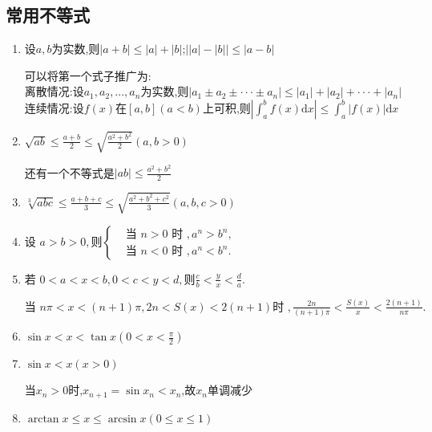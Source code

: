 \documentclass[12pt, a4paper, oneside, UTF8]{ctexbook}  %
\begin{document}
\begin{sloppypar}
    \subsection{常用不等式}
    \begin{enumerate}
        \item 设$a,b$为实数,则$|a+b|\leq |a|+|b|$;$\mid|a|-|b|\mid\leqslant|a-b|$
              \begin{criterion}{}{}
                  可以将第一个式子推广为:\\
                  离散情况:设$a_1,a_2,...,a_n$为实数,则$|a_1\pm a_2\pm\cdotp\cdotp\cdotp \pm a_n|\leqslant|a_1|+|a_2|+\cdotp\cdotp\cdotp+|a_n|$\\
                  连续情况:设$f(x)$在$[a,b](a<b)$上可积,则$\left|\int_a^bf\left(x\right)\mathrm{d}x\right|\leqslant\int_a^b\big|f(x)\big|\mathrm{d}x$
              \end{criterion}
        \item $\sqrt{ab}{\leqslant}\frac{a+b}{2}{\leqslant}\sqrt{\frac{a^{2}+b^{2}}{2}}(a,b{>}0)$
              \begin{criterion}{}{}
                  还有一个不等式是$|ab|\leqslant \frac{a^2+b^2}{2}$
              \end{criterion}
        \item $\sqrt[3]{abc}\leqslant\frac{a+b+c}3\leqslant\sqrt{\frac{a^2+b^2+c^2}3}(a,b,c>0)$
        \item $\text{设 }a>b>0,\text{则}\left\{\begin{aligned}&\text{当 }n>0\text{ 时 },a^n>b^n,\\&\text{当 }n<0\text{ 时 },a^n<b^n.\end{aligned}\right.$
        \item $\text{若 }0<a<x<b,0<c<y<d,\text{则}\frac{c}{b}<\frac{y}{x}<\frac{d}{a}.$
              \begin{criterion}{}{}
                  $\text{当 }n\pi<x<(n+1)\pi,2n<S(x)<2(n+1)\text{时 },\frac{2n}{(n+1)\pi}<\frac{S(x)}{x}<\frac{2(n+1)}{n\pi}.$
              \end{criterion}
        \item $\sin x<x<\tan x\left(0<x<\frac{\pi}{2}\right)$
        \item $\sin x < x(x>0)$
              \begin{criterion}{}{}
                  当$x_n>0$时,$x_{n+1}=\sin x_n <x_n$,故${x_n}$单调减少
              \end{criterion}
        \item $\arctan x{\leqslant}x{\leqslant}\arcsin x(0{\leqslant}x{\leqslant}1)$

\end{enumerate}
\end{sloppypar}
\end{document}

